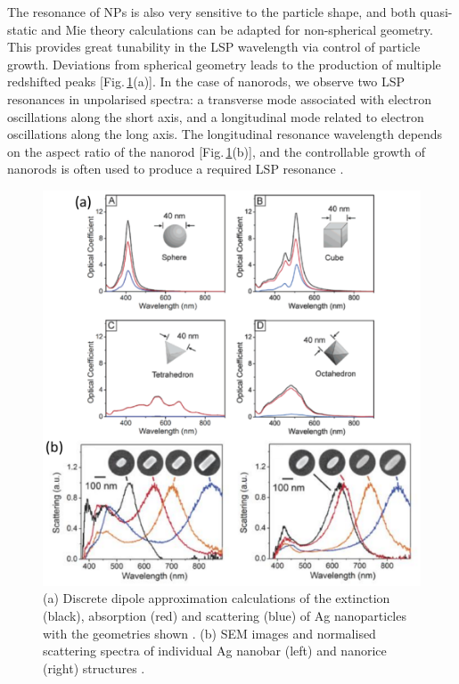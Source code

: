 The resonance of NPs is also very sensitive to the particle shape, and both quasi-static and Mie theory calculations can be adapted for non-spherical geometry. This provides great tunability in the LSP wavelength via control of particle growth. Deviations from spherical geometry leads to the production of multiple redshifted peaks [Fig.\,\ref{3Fig10}(a)]. In the case of nanorods, we observe two LSP resonances in unpolarised spectra: a transverse mode associated with electron oscillations along the short axis, and a longitudinal mode related to electron oscillations along the long axis. The longitudinal resonance wavelength depends on the aspect ratio of the nanorod [Fig.\,\ref{3Fig10}(b)], and the controllable growth of nanorods is often used to produce a required LSP resonance \cite{Wiley2006, Wiley2007, Chen2013}.
\begin{figure}[h!] 
\centering    
\includegraphics[width=\textwidth]{Fig10}
\caption{(a) Discrete dipole approximation calculations of the extinction (black), absorption (red) and scattering (blue) of Ag nanoparticles with the geometries shown \cite{Wiley2006}. (b) SEM images and normalised scattering spectra of individual Ag nanobar (left) and nanorice (right) structures \cite{Wiley2007}.}
\label{3Fig10}
\end{figure}

